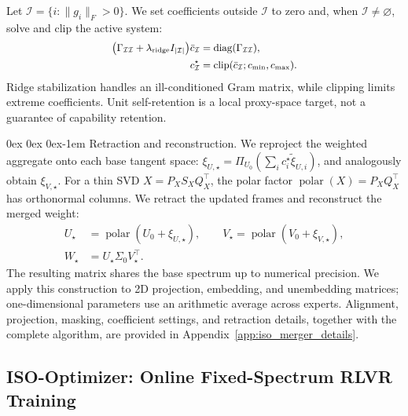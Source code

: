 \documentclass[11pt, a4paper]{utda}
\makeatletter
\renewcommand{\paragraph}{%
  \@startsection{paragraph}{4}%
  {\z@}{0ex \@plus 0ex \@minus 0ex}{-1em}%
  {\normalfont\normalsize\bfseries}%
}
\theoremstyle{plain}
\theoremstyle{definition}
\theoremstyle{remark}
\makeatother
\begin{document}
Let $\mathcal I=\{i:\|g_i\|_F>0\}$.
We set coefficients outside $\mathcal I$ to zero and, when
$\mathcal I\neq\varnothing$, solve and clip the active system:
\begin{equation}
\small
\label{eq:iso_merger_retention_system}
\begin{aligned}
    \bigl(\Gamma_{\mathcal I\mathcal I}
        +\lambda_{\mathrm{ridge}}I_{|\mathcal I|}\bigr)
        \bar c_{\mathcal I}
    &=\operatorname{diag}(\Gamma_{\mathcal I\mathcal I}),\\
    c^\star_{\mathcal I}
    &=\operatorname{clip}
        (\bar c_{\mathcal I};c_{\min},c_{\max}).
\end{aligned}
\end{equation}
Ridge stabilization handles an ill-conditioned Gram matrix,
while clipping limits extreme coefficients.
Unit self-retention is a local proxy-space target, not a
guarantee of capability retention.

\paragraph{Retraction and reconstruction.}
We reproject the weighted aggregate onto each base tangent space:
$\xi_{U,\star}=\Pi_{U_0}(\sum_i c_i^\star\widetilde\xi_{U,i})$,
and analogously obtain $\xi_{V,\star}$.
For a thin SVD $X=P_XS_XQ_X^\top$, the polar factor
$\operatorname{polar}(X)=P_XQ_X^\top$ has orthonormal columns.
We retract the updated frames and reconstruct the merged weight:
\begin{equation}
\label{eq:iso_merger_reconstruction}
\begin{aligned}
    U_\star&=\operatorname{polar}(U_0+\xi_{U,\star}),
    \qquad
    V_\star=\operatorname{polar}(V_0+\xi_{V,\star}),\\
    W_\star&=U_\star\Sigma_0V_\star^\top.
\end{aligned}
\end{equation}
The resulting matrix shares the base spectrum up to numerical
precision.
We apply this construction to 2D projection, embedding, and
unembedding matrices; one-dimensional parameters use an
arithmetic average across experts.
Alignment, projection, masking, coefficient settings, and
retraction details, together with the complete algorithm,
are provided in Appendix~\ref{app:iso_merger_details}.


\subsection{ISO-Optimizer: Online Fixed-Spectrum RLVR Training}
\label{sec:iso_optimizer}
\end{document}
